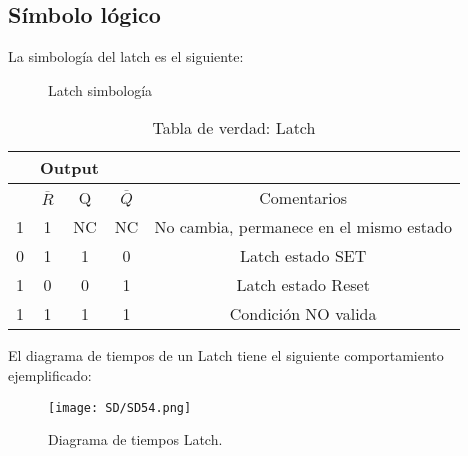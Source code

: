 \documentclass[
	12pt, %
	fleqn, %
	a4paper, %
	oneside, %
]{LegrandOrangeBook}
\begin{document}
\subsection{Símbolo lógico}
La simbología del latch es el siguiente:
\begin{figure}
    \centering
    \qquad
    \caption{Latch simbología}
\end{figure}
\begin{table}[h]
\begin{center}
\begin{tabular}{|cc|cc|c|}
\hline
\rowcolor{ocre!70}
\multicolumn{2}{|c|}{Input}                           & \multicolumn{2}{c|}{Output}              &                                         \\ \hline
\rowcolor{ocre!50}
\multicolumn{1}{|c|}{$\overline{S}$} & $\overline{R}$ & \multicolumn{1}{c|}{Q}  & $\overline{Q}$ & Comentarios                             \\ \hline
\multicolumn{1}{|c|}{1}              & 1              & \multicolumn{1}{c|}{NC} & NC             & No cambia, permanece en el mismo estado \\ \hline
\multicolumn{1}{|c|}{0}              & 1              & \multicolumn{1}{c|}{1}  & 0              & Latch estado SET                        \\ \hline
\multicolumn{1}{|c|}{1}              & 0              & \multicolumn{1}{c|}{0}  & 1              & Latch estado Reset                      \\ \hline
\multicolumn{1}{|c|}{1}              & 1              & \multicolumn{1}{c|}{1}  & 1              & Condición NO valida                     \\ \hline
\end{tabular}
\caption{Tabla de verdad: Latch}
\end{center}
\end{table}
El diagrama de tiempos de un Latch tiene el siguiente comportamiento ejemplificado:
\begin{figure}[H]
\centering
\texttt{[image: SD/SD54.png]}
\caption{Diagrama de tiempos Latch.}
\end{figure}
\end{document}

